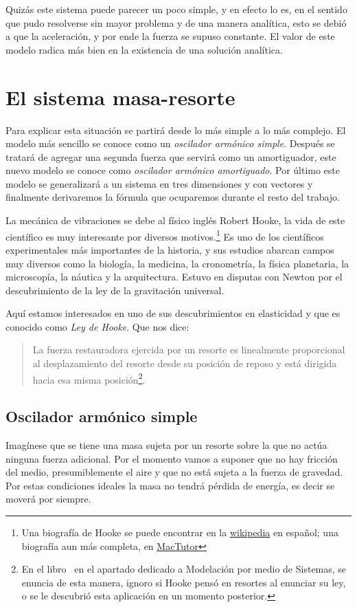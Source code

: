 Quizás este sistema puede parecer un poco simple, y en efecto lo es, en el sentido que pudo resolverse sin mayor problema y de una manera analítica, esto se debió a que la aceleración, y por ende la fuerza se supuso constante.
El valor de este modelo radica más bien en la existencia de una solución analítica.

\section{El sistema masa-resorte}

Para explicar esta situación se partirá desde lo más simple a lo más complejo.
El modelo más sencillo se conoce como un \emph{oscilador armónico simple}.
Después se tratará de agregar una segunda fuerza que servirá como un amortiguador, este nuevo modelo se conoce como \emph{oscilador armónico amortiguado}.
Por último este modelo se generalizará a un sistema en tres dimensiones y con vectores y finalmente derivaremos la fórmula que ocuparemos durante el resto del trabajo. 

La mecánica de vibraciones se debe al físico inglés Robert Hooke, la vida de este científico es muy interesante por diversos motivos.\footnote{Una biografía de Hooke se puede encontrar en la \href{https://es.wikipedia.org/wiki/Robert_Hooke}{wikipedia} en español; una biografía aun más completa, en \href{https://mathshistory.st-andrews.ac.uk/Biographies/Hooke/}{MacTutor}}
Es uno de los científicos experimentales más importantes de la historia,  y sus estudios abarcan campos muy diversos como la biología, la medicina, la cronometría, la física planetaria, la microscopía, la náutica y la arquitectura. 
Estuvo en disputas con Newton por el descubrimiento de la ley de la gravitación universal.

Aquí estamos interesados en uno de sus descubrimientos en elasticidad y que es conocido como \emph{Ley de Hooke}.
Que nos dice: 
\begin{quote}
La fuerza restauradora ejercida por un resorte es linealmente proporcional al desplazamiento del resorte desde su posición de reposo y está dirigida hacia esa misma posición\footnote{En el libro~\cite{Blanchard:Ecuaciones} en el apartado dedicado a Modelación por medio de Sistemas, se enuncia de esta manera, ignoro si Hooke pensó en resortes al enunciar su ley, o se le descubrió esta aplicación en un momento posterior.}.
\end{quote}

\subsection{Oscilador armónico simple}
Imagínese que se tiene una masa sujeta por un resorte sobre la que no actúa ninguna fuerza adicional.
Por el momento vamos a suponer que no hay fricción del medio, presumiblemente el aire y que no está sujeta a la fuerza de gravedad.
Por estas condiciones ideales la masa no tendrá pérdida de energía, es decir se moverá por siempre.


